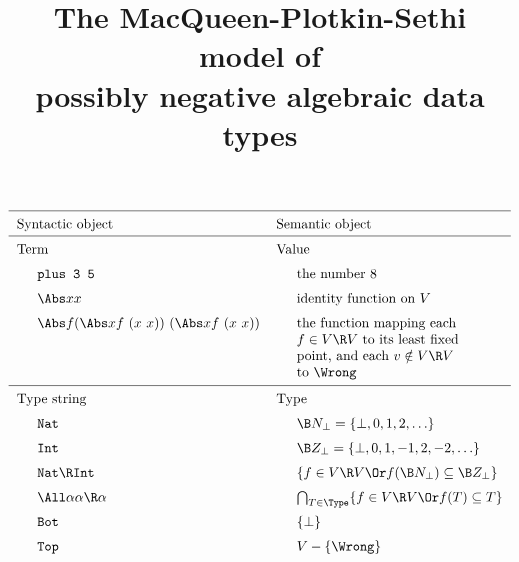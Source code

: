 \documentclass{amsart}
\title[The MPS model of possibly negative algebraic data types]
{The MacQueen-Plotkin-Sethi model of
\\
possibly negative algebraic data types}
\begin{document}
\maketitle

\def\thingsExpressibleInMpsModel{%
subtyping, universal types, union and intersection types,
recursive types, dependent types, and higher kinds%
}

\vfill

\[
\def\miniwidth{0.4\textwidth}
\renewcommand\arraystretch{1.5}
\begin{tabular}{ll}
\hline Syntactic object \hspace{1cm}\null& Semantic object \\


\hline Term & Value \\


\indent\texttt{plus 3 5} & \indent the number $8$ \\

\indent$\Abs x x$ & \indent identity function on $V$\\

\indent$\Abs f (\Abs x f~(x~x))~(\Abs x f~(x~x))$
&\indent
\begin{minipage}[t]{\miniwidth}\raggedright
the function mapping each $f\in V\R V$ to its least
fixed point, and each $v\notin V\R V$ to~$\Wrong$
\end{minipage}
\vspace{1ex}
\\


\hline Type string & Type \\


\indent\texttt{Nat} & \indent$\B N_\bot = \{\bot,0,1,2,\ldots\}$ \\

\indent\texttt{Int} & \indent$\B Z_\bot = \{\bot, 0, 1, -1, 2, -2, \ldots\}$\\

\indent$\texttt{Nat}\R\texttt{Int}$ & \indent$\{f\in V\R V \Or f(\B N_\bot)\subseteq \B Z_\bot\}$ \\

\indent$\All\alpha\alpha\R\alpha$ & \indent$\bigcap_{T\in\Type}\{f\in V\R V \Or f(T) \subseteq T\}$ \\

\indent \texttt{Bot} & \indent $\{\bot\}$ \\

\indent \texttt{Top} & \indent $V-\{\Wrong\}$ \\



\end{tabular}\]
\end{document}
